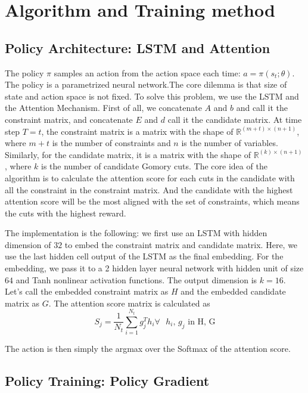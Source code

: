 \documentclass{article}
\begin{document}
\section{Algorithm and Training method}
\subsection{Policy Architecture: LSTM and Attention}

The policy $\pi$ samples an action from the action space each time: $a = \pi(s_t ; \theta)$. The policy is a parametrized neural network.The core dilemma is that size of state and action space is not fixed. To solve this problem, we use the LSTM\cite{lstm} and the Attention Mechanism\cite{attention1}\cite{attention2}. First of all, we concatenate $A$ and $b$ and call it the constraint matrix, and concatenate $E$ and $d$ call it the candidate matrix. At time step $T = t$, the constraint matrix is a matrix with the shape of $\mathbb{R} ^ {(m+t) \times (n+1)}$, where $m+t$ is the number of constraints and $n$ is the number of variables. Similarly, for the candidate matrix, it is a matrix with the shape of $\mathbb{R} ^ {(k) \times (n+1)}$, where $k$ is the number of candidate Gomory cuts. The core idea of the algorithm is to calculate the attention score for each cuts in the candidate with all the constraint in the constraint matrix.\cite{rlcut} And the candidate with the highest attention score will be the most aligned with the set of constraints, which means the cuts with the highest reward. 

The implementation is the following: we first use an LSTM with hidden dimension of $32$ to embed the constraint matrix and candidate matrix. Here, we use the last hidden cell output of the LSTM as the final embedding. For the embedding, we pass it to a 2 hidden layer neural network with hidden unit of size $64$ and Tanh nonlinear activation functions. The output dimension is $k = 16$. Let's call the embedded constraint matrix as $H$ and the embedded candidate matrix as $G$. The attention score matrix is calculated as
 \[S_j = \frac{1}{N_t}\sum_{i=1}^{N_t} g_j^Th_i \text{$\forall$ $h_i$, $g_j$ in H, G} \]
 
 The action is then simply the argmax over the Softmax of the attention score.

\subsection{Policy Training: Policy Gradient}
\end{document}
